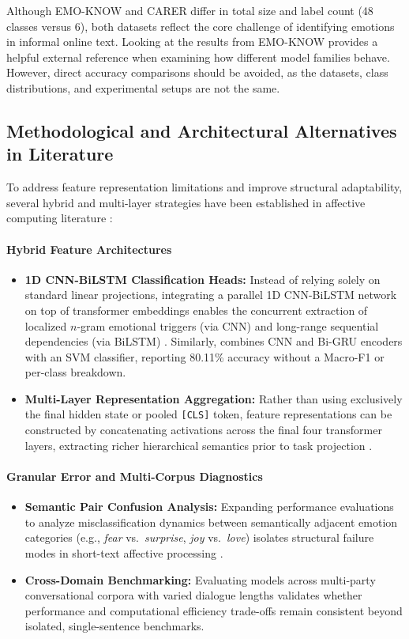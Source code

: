 \documentclass[conference]{IEEEtran}
\begin{document}
Although EMO-KNOW and CARER differ in total size and label count (48 classes versus 6), both datasets reflect the core challenge of identifying emotions in informal online text. Looking at the results from EMO-KNOW provides a helpful external reference when examining how different model families behave. However, direct accuracy comparisons should be avoided, as the datasets, class distributions, and experimental setups are not the same.

\subsection{Methodological and Architectural Alternatives in Literature}

To address feature representation limitations and improve structural adaptability, several hybrid and multi-layer strategies have been established in affective computing literature \cite{luo23_interspeech}:

\paragraph{Hybrid Feature Architectures}
\begin{itemize}
    \item \textbf{1D CNN-BiLSTM Classification Heads:} Instead of relying solely on standard linear projections, integrating a parallel 1D CNN-BiLSTM network on top of transformer embeddings enables the concurrent extraction of localized $n$-gram emotional triggers (via CNN) and long-range sequential dependencies (via BiLSTM) \cite{luo23_interspeech}. Similarly, \cite{bharti_2022_computational} combines CNN and Bi-GRU encoders with an SVM classifier, reporting 80.11\% accuracy without a Macro-F1 or per-class breakdown.
    \item \textbf{Multi-Layer Representation Aggregation:} Rather than using exclusively the final hidden state or pooled \texttt{[CLS]} token, feature representations can be constructed by concatenating activations across the final four transformer layers, extracting richer hierarchical semantics prior to task projection \cite{luo23_interspeech}.
\end{itemize}

\paragraph{Granular Error and Multi-Corpus Diagnostics}
\begin{itemize}
    \item \textbf{Semantic Pair Confusion Analysis:} Expanding performance evaluations to analyze misclassification dynamics between semantically adjacent emotion categories (e.g., \textit{fear} vs.\ \textit{surprise}, \textit{joy} vs.\ \textit{love}) isolates structural failure modes in short-text affective processing \cite{luo23_interspeech}.
    \item \textbf{Cross-Domain Benchmarking:} Evaluating models across multi-party conversational corpora with varied dialogue lengths validates whether performance and computational efficiency trade-offs remain consistent beyond isolated, single-sentence benchmarks.
\end{itemize}
\end{document}
